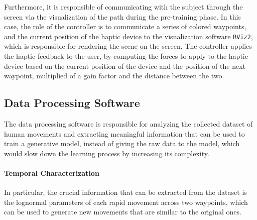 \documentclass[12pt]{report}
\begin{document}
Furthermore, it is responsible of communicating with the subject through the screen via  the visualization of the path during the pre-training phase. In this case, the role of the controller is to communicate a series of colored waypoints, and the current position of the haptic device to the visualization software \texttt{RViz2}, which is responsible for rendering the scene on the screen. The controller applies the haptic feedback to the user, by computing the forces to apply to the haptic device based on the current position of the device and the position of the next waypoint, multiplied of a gain factor and the distance between the two.


\subsection{Data Processing Software}
The data processing software is responsible for analyzing the collected dataset of human movements and extracting meaningful information that can be used to train a generative model, instead of giving the raw data to the model, which would slow down the learning process by increasing its complexity.

\paragraph{Temporal Characterization}
In particular, the crucial information that can be extracted from the dataset is the lognormal parameters of each rapid movement across two waypoints, which can be used to generate new movements that are similar to the original ones. 
\end{document}
